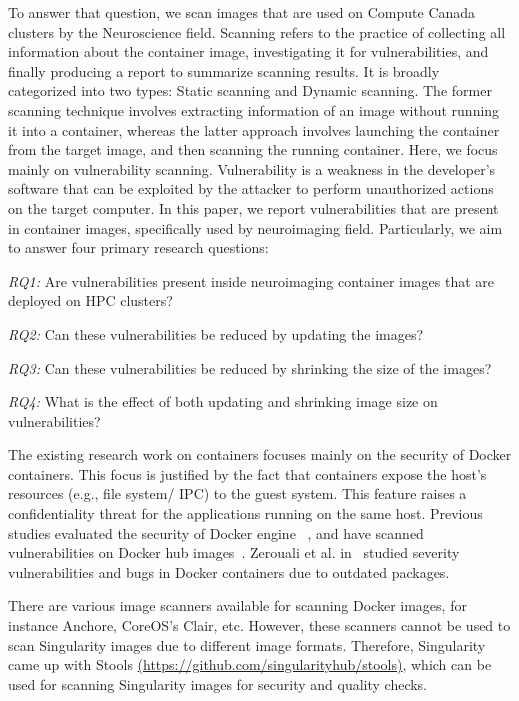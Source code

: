 \documentclass[a4paper,num-refs]{oup-contemporary}
\begin{document}
To answer that question, we scan images that are used on Compute
Canada clusters by the Neuroscience field. Scanning refers to the practice of
collecting all information about the container image, investigating it
for vulnerabilities, and finally producing a
report to summarize scanning results. It is broadly categorized into
two types: Static scanning and Dynamic scanning. The former scanning technique
involves extracting information of an image without running it into a container,
whereas the latter approach involves launching the container from the target image, and
then scanning the running container.
Here, we focus mainly on vulnerability scanning.
Vulnerability is a weakness in the developer's software that can be exploited
by the attacker to perform unauthorized actions on the target computer.
In this paper, we report vulnerabilities that are present in
container images, specifically used by neuroimaging field. Particularly,
we aim to answer four primary research questions:

\textit{RQ1:} Are vulnerabilities present inside neuroimaging container images that are
deployed on HPC clusters?

\textit{RQ2:} Can these vulnerabilities be reduced by updating the images?

\textit{RQ3:} Can these vulnerabilities be reduced by shrinking the size of the images?

\textit{RQ4:} What is the effect of both updating
and shrinking image size on vulnerabilities?

The existing research work on containers focuses mainly on the security of Docker
containers.
This focus is justified by the fact that containers expose the host's resources
(e.g., file system/ IPC) to the guest system. This feature raises a confidentiality
threat for the applications running on the same host. Previous studies evaluated
the security of Docker engine ~\cite{martin2018docker, sultan2019container, combe2016docker, bui2015analysis},
and have scanned vulnerabilities on Docker hub images~\cite{Shu2017, gummaraju2015over}.
Zerouali et al. in~\cite{zerouali2019relation} studied severity vulnerabilities and bugs in Docker 
containers due to outdated packages. 

There are various image scanners available for scanning Docker images, for
instance Anchore, CoreOS's Clair, etc.
However, these scanners cannot be used to scan Singularity images due to different image formats.
Therefore, Singularity came up with Stools \href{https://github.com/singularityhub/stools}{(https://github.com/singularityhub/stools)}, which can be used for scanning Singularity images
for security and quality checks.
\end{document}
